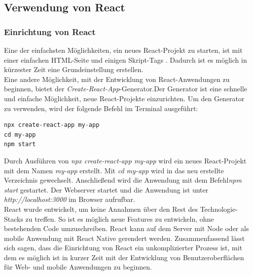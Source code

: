 \subsection{Verwendung von React}
\subsubsection{Einrichtung von React}
 Eine der einfachsten Möglichkeiten, ein neues React-Projekt zu starten, ist mit einer einfachen HTML-Seite und einigen Skript-Tags \cite{deLegacyReactjs}. Dadurch ist es möglich in kürzester Zeit eine Grundeinstellung erstellen.\\
 Eine andere Möglichkeit, mit der Entwicklung von React-Anwendungen zu beginnen, bietet der \emph{Create-React-App}-Generator\cite{vsCodeReactTutorial}.Der Generator ist eine schnelle und einfache Möglichkeit, neue React-Projekte einzurichten. Um den Generator zu verwenden, wird der folgende Befehl im Terminal ausgeführt:
 
\begin{lstlisting}[language=vhdl,
	frame=single,           % Ein Rahmen um den Code
	framexleftmargin=15pt,  % Rahmen link von den Zahlen
	style=algoBericht,
	label={App-Erstellung},
	captionpos=b ,          % Caption unter den Code setzen
	caption={Beispiel Anwendungserstellung}]
npx create-react-app my-app
cd my-app
npm start
\end{lstlisting}
Durch  Ausführen von \emph{npx create-react-app my-app} wird ein neues React-Projekt mit dem Namen \emph{my-app} erstellt. Mit \emph{cd my-app} wird in das neu erstellte Verzeichnis gewechselt. Anschließend wird die Anwendung mit dem Befehl\emph{npm start} gestartet.
Der Webserver startet und die Anwendung ist unter \emph{http://localhost:3000} im Browser aufrufbar.\\ 
React wurde entwickelt, um keine Annahmen über den Rest des Technologie-Stacks zu treffen. So ist es möglich neue Features zu entwickeln, ohne bestehenden Code umzuschreiben\cite{deLegacyReactjsDocs}. React kann  auf dem Server mit Node oder als mobile Anwendung mit React Native gerendert werden. 
Zusammenfassend lässt sich sagen, dass die Einrichtung von React ein unkomplizierter Prozess ist, mit dem es möglich ist in kurzer Zeit mit der Entwicklung von Benutzeroberflächen für Web- und mobile Anwendungen zu beginnen.

